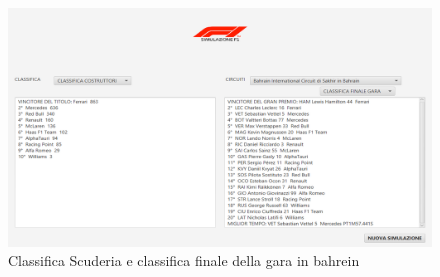 \begin{figure}[h]
\centering
\includegraphics[width=1\linewidth]{images/Risultati scuderia ottenuti con impostazioni scelte dall'utente.png}
\caption{Classifica Scuderia e classifica finale della gara in bahrein}
\label{fig:Classifica Scuderia e classifica finale di una gara}
\end{figure}
